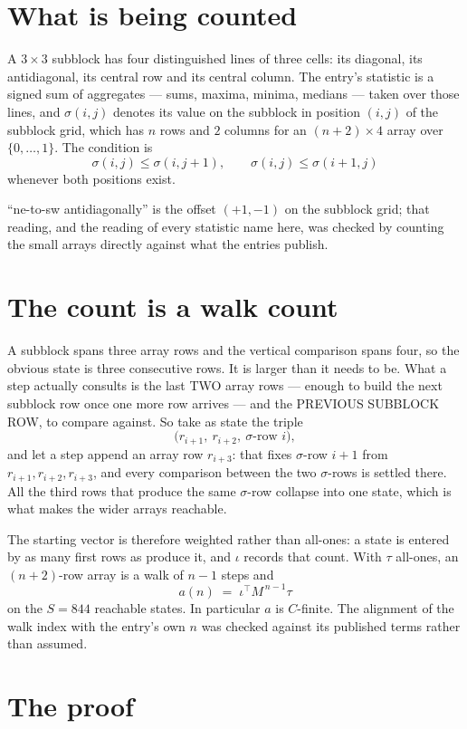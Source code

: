 \documentclass[11pt,a4paper]{article}
\theoremstyle{plain}
\theoremstyle{definition}
\begin{document}
\section{What is being counted}

A $3\times3$ subblock has four distinguished lines of three cells: its diagonal, its
antidiagonal, its central row and its central column. The entry's statistic is a signed sum of
aggregates --- sums, maxima, minima, medians --- taken over those lines, and $\sigma(i,j)$
denotes its value on the subblock in position $(i,j)$ of the subblock grid, which has $n$ rows
and $2$ columns for an $(n+2)\times4$ array over $\{0,\dots,1\}$. The condition is
\[
\sigma(i,j)\le\sigma(i,j+1),\qquad \sigma(i,j)\le\sigma(i+1,j)
\]
whenever both positions exist.

``ne-to-sw antidiagonally'' is the offset $(+1,-1)$ on the subblock grid; that reading, and
the reading of every statistic name here, was checked by counting the small arrays directly
against what the entries publish.

\section{The count is a walk count}

A subblock spans three array rows and the vertical comparison spans four, so the obvious state
is three consecutive rows. It is larger than it needs to be. What a step actually consults is
the last TWO array rows --- enough to build the next subblock row once one more row arrives ---
and the PREVIOUS SUBBLOCK ROW, to compare against. So take as state the triple
\[
\bigl(r_{i+1},\ r_{i+2},\ \sigma\text{-row }i\bigr),
\]
and let a step append an array row $r_{i+3}$: that fixes $\sigma$-row $i+1$ from
$r_{i+1},r_{i+2},r_{i+3}$, and every comparison between the two $\sigma$-rows is settled
there. All the third rows that produce the same $\sigma$-row collapse into one state, which is
what makes the wider arrays reachable.

The starting vector is therefore weighted rather than all-ones: a state is entered by as many
first rows as produce it, and $\iota$ records that count. With $\tau$ all-ones, an
$(n+2)$-row array is a walk of $n-1$ steps and
\[
a(n)\;=\;\iota^{\!\top}M^{\,n-1}\tau
\]
on the $S=844$ reachable states. In particular $a$ is $C$-finite. The alignment of the walk
index with the entry's own $n$ was checked against its published terms rather than assumed.

\section{The proof}
\end{document}
